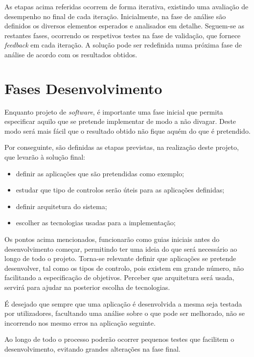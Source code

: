 As etapas acima referidas ocorrem de forma iterativa, existindo uma avaliação de desempenho no final de cada iteração. Inicialmente, na fase de análise são definidos os diversos elementos esperados e analisados em detalhe. Seguem-se as restantes fases, ocorrendo os respetivos testes na fase de validação, que fornece \textit{feedback} em cada iteração. A solução pode ser redefinida numa próxima fase de análise de acordo com os resultados obtidos. 



\section{Fases Desenvolvimento}

	Enquanto projeto de \textit{software}, é importante uma fase inicial que permita especificar aquilo que se pretende implementar de modo a não divagar. Deste modo será mais fácil que o resultado obtido não fique aquém do que é pretendido.

	Por conseguinte, são definidas as etapas previstas, na realização deste projeto, que levarão à solução final:

	\begin{itemize}
		\item definir as aplicações que são pretendidas como exemplo;
		\item estudar que tipo de controlos serão úteis para as aplicações definidas;
		\item definir arquitetura do sistema;
		\item escolher as tecnologias usadas para a implementação;
	\end{itemize}  

	Os pontos acima mencionados, funcionarão como guias iniciais antes do desenvolvimento começar, permitindo ter uma ideia do que será necessário ao longo de todo o projeto.
	Torna-se relevante definir que aplicações se pretende desenvolver, tal como os tipos de controlo, pois existem em grande número, não facilitando a especificação de objetivos. Perceber que arquitetura será usada, servirá para ajudar na posterior escolha de tecnologias.
	
	É desejado que sempre que uma aplicação é desenvolvida a mesma seja testada por utilizadores, facultando uma análise sobre o que pode ser melhorado, não se incorrendo nos mesmo erros na aplicação seguinte.

	Ao longo de todo o processo poderão ocorrer pequenos testes que facilitem o desenvolvimento, evitando grandes alterações na fase final. 


